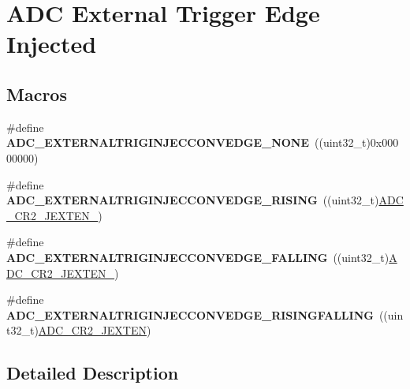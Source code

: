 \hypertarget{group___a_d_c_ex___external__trigger__edge___injected}{}\section{A\+DC External Trigger Edge Injected}
\label{group___a_d_c_ex___external__trigger__edge___injected}
\subsection*{Macros}
\begin{DoxyCompactItemize}
\item 
\#define {\bfseries A\+D\+C\+\_\+\+E\+X\+T\+E\+R\+N\+A\+L\+T\+R\+I\+G\+I\+N\+J\+E\+C\+C\+O\+N\+V\+E\+D\+G\+E\+\_\+\+N\+O\+NE}~((uint32\+\_\+t)0x00000000)\hypertarget{group___a_d_c_ex___external__trigger__edge___injected_gaedb012452f83496891fcf1992130a0de}{}\label{group___a_d_c_ex___external__trigger__edge___injected_gaedb012452f83496891fcf1992130a0de}

\item 
\#define {\bfseries A\+D\+C\+\_\+\+E\+X\+T\+E\+R\+N\+A\+L\+T\+R\+I\+G\+I\+N\+J\+E\+C\+C\+O\+N\+V\+E\+D\+G\+E\+\_\+\+R\+I\+S\+I\+NG}~((uint32\+\_\+t)\hyperlink{group___peripheral___registers___bits___definition_ga0b3c99510de210ff3137ff8de328889b}{A\+D\+C\+\_\+\+C\+R2\+\_\+\+J\+E\+X\+T\+E\+N\+\_})\hypertarget{group___a_d_c_ex___external__trigger__edge___injected_gaf5561fa00f50245c3e497ed5bd70d25e}{}\label{group___a_d_c_ex___external__trigger__edge___injected_gaf5561fa00f50245c3e497ed5bd70d25e}

\item 
\#define {\bfseries A\+D\+C\+\_\+\+E\+X\+T\+E\+R\+N\+A\+L\+T\+R\+I\+G\+I\+N\+J\+E\+C\+C\+O\+N\+V\+E\+D\+G\+E\+\_\+\+F\+A\+L\+L\+I\+NG}~((uint32\+\_\+t)\hyperlink{group___peripheral___registers___bits___definition_ga949c70fdf36a32a6afcbf44fec123832}{A\+D\+C\+\_\+\+C\+R2\+\_\+\+J\+E\+X\+T\+E\+N\+\_})\hypertarget{group___a_d_c_ex___external__trigger__edge___injected_ga517972cd277a53e20ff2e44b3e07afa6}{}\label{group___a_d_c_ex___external__trigger__edge___injected_ga517972cd277a53e20ff2e44b3e07afa6}

\item 
\#define {\bfseries A\+D\+C\+\_\+\+E\+X\+T\+E\+R\+N\+A\+L\+T\+R\+I\+G\+I\+N\+J\+E\+C\+C\+O\+N\+V\+E\+D\+G\+E\+\_\+\+R\+I\+S\+I\+N\+G\+F\+A\+L\+L\+I\+NG}~((uint32\+\_\+t)\hyperlink{group___peripheral___registers___bits___definition_ga07330f702208792faca3a563dc4fd9c6}{A\+D\+C\+\_\+\+C\+R2\+\_\+\+J\+E\+X\+T\+EN})\hypertarget{group___a_d_c_ex___external__trigger__edge___injected_ga874e33f936d9cfc440a46919bf132b22}{}\label{group___a_d_c_ex___external__trigger__edge___injected_ga874e33f936d9cfc440a46919bf132b22}

\end{DoxyCompactItemize}


\subsection{Detailed Description}

